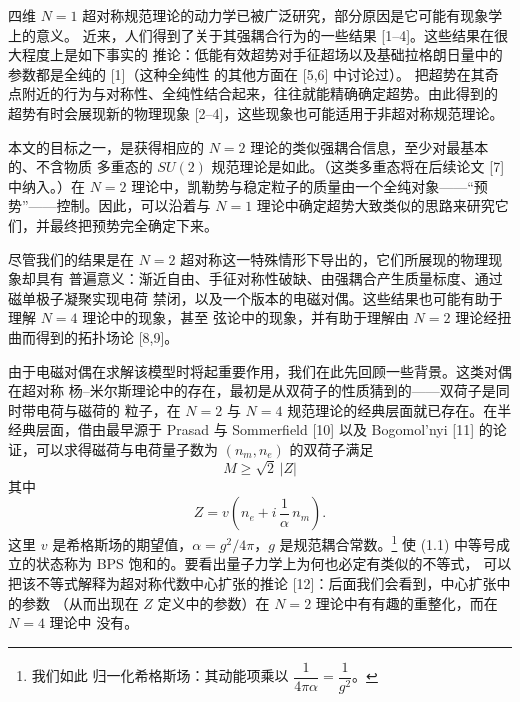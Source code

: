 \documentclass[11pt,a4paper,UTF8,fontset=fandol]{ctexart}
\theoremstyle{plain}
\theoremstyle{definition}
\newcommand{\Nc}{\mathcal{N}}
\def\Nc{N}%
\begin{document}
四维 $\Nc=1$ 超对称规范理论的动力学已被广泛研究，部分原因是它可能有现象学上的意义。
近来，人们得到了关于其强耦合行为的一些结果 [1--4]。这些结果在很大程度上是如下事实的
推论：低能有效超势对手征超场以及基础拉格朗日量中的参数都是全纯的 [1]（这种全纯性
的其他方面在 [5,6] 中讨论过）。%
把超势在其奇点附近的行为与对称性、全纯性结合起来，往往就能精确确定超势。由此得到的
超势有时会展现新的物理现象 [2--4]，这些现象也可能适用于非超对称规范理论。

本文的目标之一，是获得相应的 $\Nc=2$ 理论的类似强耦合信息，至少对最基本的、不含物质
多重态的 $SU(2)$ 规范理论是如此。（这类多重态将在后续论文 [7] 中纳入。）在 $\Nc=2$
理论中，凯勒势与稳定粒子的质量由一个全纯对象——“预势”——控制。因此，可以沿着与
$\Nc=1$ 理论中确定超势大致类似的思路来研究它们，并最终把预势完全确定下来。

尽管我们的结果是在 $\Nc=2$ 超对称这一特殊情形下导出的，它们所展现的物理现象却具有
普遍意义：渐近自由、手征对称性破缺、由强耦合产生质量标度、通过磁单极子凝聚实现电荷
禁闭，以及一个版本的电磁对偶。这些结果也可能有助于理解 $\Nc=4$ 理论中的现象，甚至
弦论中的现象，并有助于理解由 $\Nc=2$ 理论经扭曲而得到的拓扑场论 [8,9]。

由于电磁对偶在求解该模型时将起重要作用，我们在此先回顾一些背景。这类对偶在超对称
杨--米尔斯理论中的存在，最初是从双荷子的性质猜到的——双荷子是同时带电荷与磁荷的
粒子，在 $\Nc=2$ 与 $\Nc=4$ 规范理论的经典层面就已存在。在半经典层面，借由最早源于
Prasad 与 Sommerfield [10] 以及 Bogomol'nyi [11] 的论证，可以求得磁荷与电荷量子数为
$(n_m,n_e)$ 的双荷子满足
\begin{equation}
  M\ge \sqrt{2}\,|Z| \tag{1.1}
\end{equation}
其中
\begin{equation}
  Z=v\left(n_e+i\,\frac{1}{\alpha}\,n_m\right). \tag{1.2}
\end{equation}
这里 $v$ 是希格斯场的期望值，$\alpha=g^2/4\pi$，$g$ 是规范耦合常数。\footnote{我们如此
归一化希格斯场：其动能项乘以 $\dfrac{1}{4\pi\alpha}=\dfrac{1}{g^2}$。}
使 (1.1) 中等号成立的状态称为 BPS 饱和的。要看出量子力学上为何也必定有类似的不等式，
可以把该不等式解释为超对称代数中心扩张的推论 [12]：后面我们会看到，中心扩张中的参数
（从而出现在 $Z$ 定义中的参数）在 $\Nc=2$ 理论中有有趣的重整化，而在 $\Nc=4$ 理论中
没有。%
\end{document}
